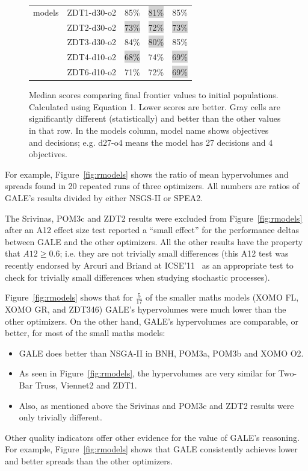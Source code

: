 \documentclass[10pt,journal,compsoc]{IEEEtran}
\newcommand{\bi}{\begin{itemize}}
\newcommand{\ei}{\end{itemize}}
\newcommand{\fig}[1]{Figure~\ref{fig:#1}}
\newenvironment{changed}{\par}{\par}
\begin{document}
\begin{changed}
\begin{figure}[!t]
\begin{tabular}{|r|c|c|c|c|}
models	&	ZDT1-d30-o2	&	85\%	&	\colorbox{lightgray}{81\%}	&	85\%	\\
	&	ZDT2-d30-o2	&	\colorbox{lightgray}{73\%}	&	\colorbox{lightgray}{72\%}	&	\colorbox{lightgray}{73\%}	\\
	&	ZDT3-d30-o2	&	84\%	&	\colorbox{lightgray}{80\%}	&	85\%	\\
	&	ZDT4-d10-o2	&	\colorbox{lightgray}{68\%}	&	74\%	&	\colorbox{lightgray}{69\%}	\\
	&	ZDT6-d10-o2	&	71\%	&	72\%	&	\colorbox{lightgray}{69\%}	\\ \hline
\end{tabular}
\caption{Median scores comparing final frontier values to
initial populations. Calculated using Equation 1. Lower
scores are better. Gray cells are significantly different
(statistically) and better than the other values in that row.
In the models column, model name shows objectives and decisions;
e.g. d27-o4 means
the model has 27 decisions and 4 objectives.  }
\label{fig:whateveryouwannacallme}
\end{figure}

For example, \fig{rmodels} shows the ratio of mean hypervolumes 
and spreads found in 20 repeated runs of three optimizers. All numbers are ratios of GALE's results divided
by either NSGS-II or SPEA2.  

The Srivinas, POM3c and ZDT2 results were
excluded from \fig{rmodels} after an A12 effect size test
reported a ``small effect'' for the performance deltas between GALE and the other optimizers.
All the other results have the property that $\mathit{A12} \ge 0.6$; i.e. they are not trivially small
differences
  (this A12
  test was recently endorsed by Arcuri and
  Briand at ICSE'11~\cite{arcuri11} as an
  appropriate test to check for trivially small
  differences when studying stochastic processes).

\fig{rmodels} shows that for $\frac{5}{17}$
of the smaller maths models (XOMO FL, XOMO GR, and
ZDT346) GALE's hypervolumes were much lower than the
other optimizers.  On the other hand, GALE's
hypervolumes are comparable, or better, for most of
the small maths models: \bi
\item
GALE does better than NSGA-II in BNH, POM3a, POM3b and XOMO
O2.
\item As seen in 
\fig{rmodels}, the hypervolumes are very similar for Two-Bar Truss,
Viennet2 and ZDT1.  
\item
Also, as mentioned
above the Srivinas and POM3c and ZDT2 results were only trivially different.
\ei
Other quality indicators offer other evidence for
the
value of GALE's reasoning. For example, \fig{rmodels} shows that GALE
consistently achieves lower and better spreads than the other optimizers.


\end{changed}
\end{document}
